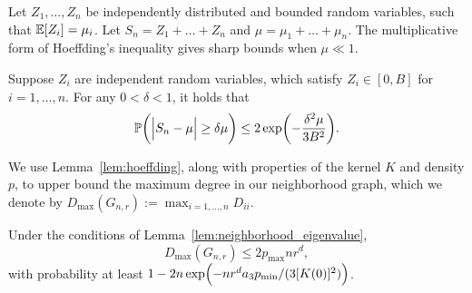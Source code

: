 Let $Z_1,\ldots,Z_n$ be independently distributed and bounded random variables, such that $\mathbb{E}[Z_i] = \mu_i$. Let $S_n = Z_1 + \ldots + Z_n$ and $\mu = \mu_1 + \ldots + \mu_n$. The multiplicative form of Hoeffding's inequality gives sharp bounds when $\mu \ll 1$. 
\begin{lemma}
	\label{lem:hoeffding}
	Suppose $Z_i$ are independent random variables, which satisfy $Z_i \in [0,B]$ for $i = 1,\ldots,n$. For any $0 < \delta < 1$, it holds that
	\begin{equation*}
	\mathbb{P}\biggl(\Bigl|S_n - \mu\Bigr| \geq \delta \mu\biggr) \leq 2\exp\biggl(-\frac{\delta^2\mu}{3B^2}\biggr).
	\end{equation*}
\end{lemma}
We use Lemma~\ref{lem:hoeffding}, along with properties of the kernel $K$ and density $p$, to upper bound the maximum degree in our neighborhood graph, which we denote by $D_{\max}(G_{n,r}) := \max_{i = 1,\ldots,n} D_{ii}$.
\begin{lemma}
	\label{lem:max_degree}
	Under the conditions of Lemma~\ref{lem:neighborhood_eigenvalue},
	\begin{equation*}
	D_{\max}(G_{n,r}) \leq 2p_{\max}nr^d,
	\end{equation*}
	with probability at least $1 - 2n\exp\Bigl(-nr^da_3p_{\min}/(3[K(0)]^2)\Bigr)$. 
\end{lemma}

